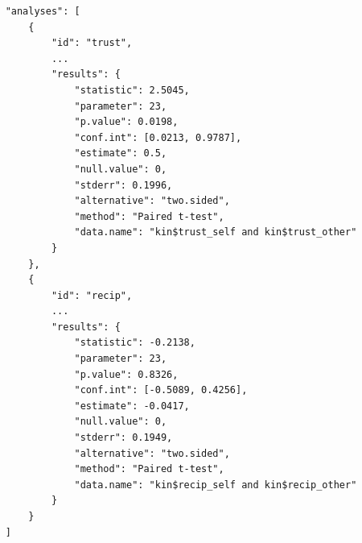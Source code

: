 \documentclass[english,doc,floatsintext]{apa6}
\begin{document}
\begin{tcolorbox}[colback=black!5!white,colframe=white!5!black,title=Box 7. Results of data analysis.]
\begin{verbatim}
    "analyses": [
        {
            "id": "trust",
            ...
            "results": {
                "statistic": 2.5045,
                "parameter": 23,
                "p.value": 0.0198,
                "conf.int": [0.0213, 0.9787],
                "estimate": 0.5,
                "null.value": 0,
                "stderr": 0.1996,
                "alternative": "two.sided",
                "method": "Paired t-test",
                "data.name": "kin$trust_self and kin$trust_other"
            }
        },
        {
            "id": "recip",
            ...
            "results": {
                "statistic": -0.2138,
                "parameter": 23,
                "p.value": 0.8326,
                "conf.int": [-0.5089, 0.4256],
                "estimate": -0.0417,
                "null.value": 0,
                "stderr": 0.1949,
                "alternative": "two.sided",
                "method": "Paired t-test",
                "data.name": "kin$recip_self and kin$recip_other"
            }
        }
    ]
\end{verbatim}
\end{tcolorbox}
\end{document}
